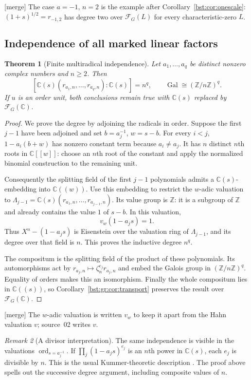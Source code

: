 \documentclass[11pt,letterpaper]{article}
\newtheorem{theorem}{Theorem}[section]
\theoremstyle{definition}
\theoremstyle{remark}
\newtheorem{remark}[theorem]{Remark}
\newcommand{\C}{\mathbb C}
\newcommand{\Z}{\mathbb Z}
\newcommand{\FF}[2]{\mathcal F_{#2}(#1)}
\newcommand{\Gal}{\operatorname{Gal}}
\begin{document}
\textup{[merge]} The case $a=-1$, $n=2$ is the example after
Corollary~\ref{bst:cor:onescale}: $(1+s)^{1/2}=r_{-1,2}$ has degree two over
$\FF LG$ for every characteristic-zero $L$.

\subsection{Independence of all marked linear factors}

\begin{theorem}[Finite multiradical independence]\label{bst:gr:thm:multirad}
Let $a_1,\ldots,a_q$ be distinct nonzero complex numbers and $n\geq2$. Then
\[
 [\C(s)(r_{a_1,n},\ldots,r_{a_q,n}):\C(s)]=n^q,
 \qquad
 \Gal\cong(\Z/n\Z)^q.
\]
If $u$ is an order unit, both conclusions remain true with $\C(s)$ replaced
by $\FF{\C}G$.
\end{theorem}
\begin{proof}
We prove the degree by adjoining the radicals in order. Suppose the first
$j-1$ have been adjoined and set $b=a_j^{-1}$, $w=s-b$. For every $i<j$,
$1-a_i(b+w)$ has nonzero constant term because $a_i\ne a_j$. It has $n$
distinct $n$th roots in $\C[[w]]$: choose an $n$th root of the constant and
apply the normalized binomial construction to the remaining unit.

Consequently the splitting field of the first $j-1$ polynomials admits a
$\C(s)$-embedding into $\C((w))$. Use this embedding to restrict the
$w$-adic valuation to $\Lambda_{j-1}=\C(s)(r_{a_1,n},\ldots,r_{a_{j-1},n})$.
Its value group is $\Z$: it is a subgroup of $\Z$ and already contains the
value $1$ of $s-b$. In this valuation,
\[
 v_w(1-a_js)=1.
\]
Thus $X^n-(1-a_js)$ is Eisenstein over the valuation ring of
$\Lambda_{j-1}$, and its degree over that field is $n$. This proves the
inductive degree $n^q$.

The compositum is the splitting field of the product of these polynomials.
Its automorphisms act by $r_{a_j,n}\mapsto\zeta_n^{e_j}r_{a_j,n}$ and embed
the Galois group in $(\Z/n\Z)^q$. Equality of orders makes this an
isomorphism. Finally the whole compositum lies in $\C((s))$, so
Corollary~\ref{bst:gr:cor:transport} preserves the result over $\FF{\C}G$.
\end{proof}

\textup{[merge]} The $w$-adic valuation is written $v_w$ to keep it apart
from the Hahn valuation $v$; source~02 writes $v$.

\begin{remark}[A divisor interpretation]\label{bst:gr:rem:divisor}
The same independence is visible in the valuations
$\operatorname{ord}_{s=a_j^{-1}}$. If $\prod_j(1-a_js)^{e_j}$ is an $n$th
power in $\C(s)$, each $e_j$ is divisible by $n$. This is the usual
Kummer-theoretic description \cite[Chapter~5, Kummer theory]{MilneFT}. The
proof above spells out the successive degree argument, including composite
values of $n$.
\end{remark}
\end{document}
